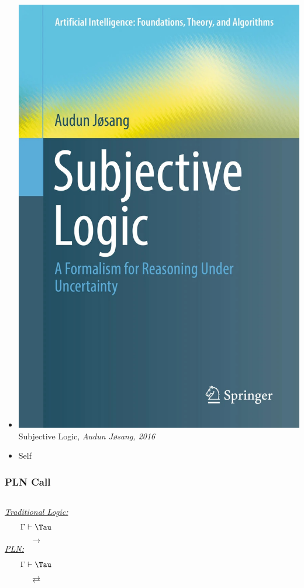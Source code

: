 \documentclass[aspectratio=169]{beamer}
\begin{document}
\begin{frame}
\begin{itemize}
  \item \includegraphics[scale=0.02]{figs/SL.jpg} Subjective Logic, \emph{Audun Jøsang, 2016}
  \item Self
  \end{itemize}
\end{frame}

\begin{frame}
  \frametitle{PLN Call}
  \begin{columns}
    \column{7cm}
    \emph{\underline{Traditional Logic:}}\\
    \vspace{1cm}
    $$\Gamma\vdash\Tau$$
    $$\rightarrow$$
    \vspace{2cm}
    \column{7cm}
    \emph{\underline{PLN:}}\\
    \vspace{1cm}
    $$\Gamma\vdash\Tau$$
    $$\rightleftarrows$$
    \vspace{2cm}
  \end{columns}
\end{frame}
\end{document}
